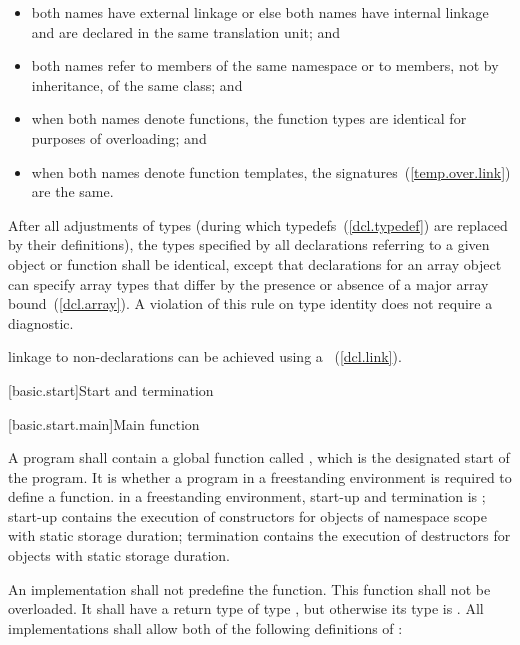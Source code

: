 \begin{itemize}
\item both names have external linkage or else both names have internal
linkage and are declared in the same translation unit; and

\item both names refer to members of the same namespace or to members,
not by inheritance, of the same class; and

\item when both names denote functions, the function types are identical
for purposes of overloading; and

\item when both names denote function templates, the
signatures~(\ref{temp.over.link}) are the same.
\end{itemize}

\pnum
{}%
%
After all adjustments of types (during which
typedefs~(\ref{dcl.typedef}) are replaced by their definitions), the
types specified by all declarations referring to a given object or
function shall be identical, except that declarations for an array
object can specify array types that differ by the presence or absence of
a major array bound~(\ref{dcl.array}). A violation of this rule on type
identity does not require a diagnostic.

\pnum
\enternote linkage to non-\Cpp declarations can be achieved using a
~(\ref{dcl.link}). \exitnote%

[basic.start]{Start and termination}

[basic.start.main]{Main function}

\pnum
{}%
%
A program shall contain a global function called , which is the designated
start of the program. It is 
whether a program in a freestanding environment is required to define a 
function. \enternote in a freestanding environment, start-up and termination is
; start-up contains the
execution of constructors for objects of namespace scope with static storage duration;
termination contains the execution of destructors for objects with static storage
duration. \exitnote

\pnum
An implementation shall not predefine the  function. This
function shall not be overloaded. It shall have a return type of type
, but otherwise its type is .
%
All implementations shall allow both of the following definitions of
:

